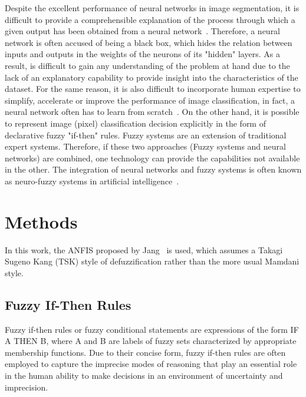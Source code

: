 \documentclass[10pt,twocolumn,letterpaper]{article}
\begin{document}
Despite the excellent performance of neural networks in image segmentation, it is difficult to provide a comprehensible explanation of the process through which a given output has been obtained from a neural network~\cite{critique}. Therefore, a neural network is often accused of being a black box, which hides the relation between inputs and outputs in the weights of the neurons of its "hidden" layers. As a result, is difficult to gain any understanding of the problem at hand due to the lack of an explanatory capability to provide insight into the characteristics of the dataset. For the same reason, it is also difficult to incorporate human expertise to simplify, accelerate or improve the performance of image classification, in fact, a neural network often has to learn from scratch~\cite{dataManual}.
On the other hand, it is possible to represent image (pixel) classification decision explicitly in the form of declarative fuzzy "if-then" rules. Fuzzy systems are an extension of traditional expert systems.
Therefore, if these two approaches (Fuzzy systems and neural networks) are combined, one technology can provide the capabilities not available in the other. The integration of neural networks and fuzzy systems is often known as neuro-fuzzy systems in artificial intelligence~\cite{dataManual}.

\section{Methods}

In this work, the ANFIS proposed by Jang~\cite{jang} is used, which assumes a Takagi Sugeno Kang (TSK) style of defuzzification rather than the more usual Mamdani style.

\subsection{Fuzzy If-Then Rules}

Fuzzy  if-then rules or fuzzy conditional statements are expressions of the form IF A THEN B, where A and B are labels of fuzzy sets characterized by appropriate  membership functions. Due  to their  concise  form, fuzzy if-then rules are often employed to capture the imprecise modes of reasoning that play an essential role in the human ability to  make decisions in an environment of uncertainty and imprecision.~\cite{jang} 
\end{document}
